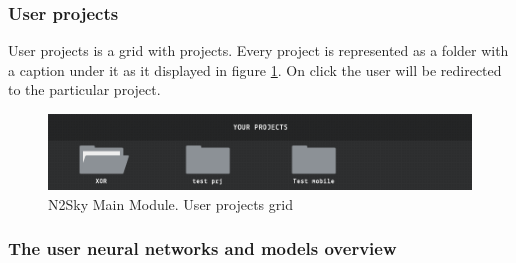 \subsubsection{User projects}

User projects is a grid with projects. Every project is represented as a folder with a caption under it as it displayed in figure \ref{fig:n2sky_dashboard_projects}. On click the user will be redirected to the particular project. 

\begin{figure}[htbp]
\begin{center}
  \includegraphics[scale=0.5]{components/5/img/n2sky_dashboard_projects.png}
  \caption{N2Sky Main Module. User projects grid}
  \label{fig:n2sky_dashboard_projects}
\end{center}
\end{figure}

 \subsubsection{The user neural networks and models overview}
 
